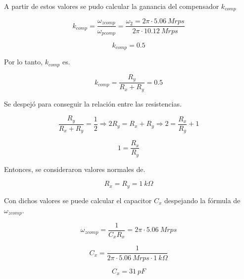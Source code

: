 \documentclass[12pt,A4paper,titlepage]{article}
\begin{document}
\hspace{1mm} A partir de estos valores se pudo calcular la ganancia del compensador \(k_{comp}\)

\begin{equation}
    k_{comp} = \frac{\omega_{zcomp}}{\omega _{pcomp}} = \frac{\omega_2 = 2\pi \cdot 5.06~Mrps}{2\pi \cdot 10.12~Mrps}
    \end{equation}

\begin{equation}
    \boxed{
    k_{comp} = 0.5
    }
\end{equation}

\hspace{1mm} Por lo tanto, \(k_{comp}\) es.

\begin{equation}
    k_{comp} = \frac{R_y}{R_x + R_y} = 0.5
\end{equation}

\hspace{1mm} Se despejó para conseguir la relación entre las resistencias.

\begin{equation}
    \frac{R_y}{R_x + R_y} = \frac{1}{2} \Longrightarrow 2R_y = R_x + R_y \Longrightarrow 2 = \frac{R_x}{R_y} + 1
\end{equation}

\begin{equation}
    \boxed{
    1 = \frac{R_x}{R_y}
    }
\end{equation}

\hspace{1mm} Entonces, se consideraron valores normales de.

\begin{equation}
    \boxed{
    R_x = R_y = 1~k\Omega
    }
\end{equation}

\hspace{1mm} Con dichos valores se puede calcular el capacitor \(C_x\) despejando la fórmula de \(\omega_{zcomp}\).

\begin{equation}
    \omega_{zcomp} = \frac{1}{C_x R_x} = 2\pi \cdot 5.06~Mrps
\end{equation}

\begin{equation}
    C_x = \frac{1}{2\pi \cdot 5.06~Mrps \cdot 1~k\Omega}
\end{equation}

\begin{equation}
    \boxed{
    C_x = 31~pF
    }
\end{equation}
\end{document}

